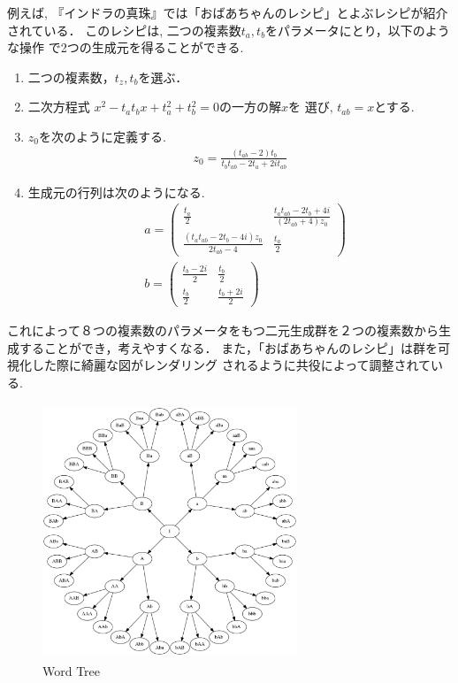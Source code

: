 例えば, 『インドラの真珠』では「おばあちゃんのレシピ」とよぶレシピが紹介
されている．
このレシピは, 二つの複素数$t_a, t_b$をパラメータにとり，以下のような操作
で2つの生成元を得ることができる.
\begin{enumerate}
 \item 二つの複素数，$t_z, t_b$を選ぶ．
 \item  二次方程式
        $x^2 - t_a t_b x + t_a^2 + t_b^2 = 0 \text{の一方の解}x\text{を
        選び, }t_{ab}= x \text{とする. }$
 \item $z_0$を次のように定義する.
       \begin{align*}
        z_0 = \frac{(t_{ab} -2)t_b}{t_b t_{ab} - 2 t_a + 2it_{ab}}
       \end{align*}
 \item 生成元の行列は次のようになる.
        \begin{align*}
       &a = \left(
      \begin{array}{ccc}
       \frac{t_a}{2} & \frac{t_a t_{ab} - 2 t_b + 4i}{(2 t_{ab} + 4)z_0} \\
       \frac{(t_a t_{ab} - 2 t_b -4i)z_0}{2 t_{ab} - 4} & \frac{t_a}{2}
      \end{array}
     \right)\\
 &b = \left(
      \begin{array}{ccc}
       \frac{t_b - 2i}{2} & \frac{t_b}{2} \\
       \frac{t_b}{2} & \frac{t_b + 2i}{2}
      \end{array}
     \right)
        \end{align*}
\end{enumerate}
これによって８つの複素数のパラメータをもつ二元生成群を２つの複素数から生
成することができ，考えやすくなる．
また，「おばあちゃんのレシピ」は群を可視化した際に綺麗な図がレンダリング
されるように共役によって調整されている.

\begin{figure}[htbp]
 \center
 \includegraphics[width=3in, height=3in, keepaspectratio]{../img/klein/wordTree.pdf}
 \caption{Word Tree}
 \label{fig:wordTree}
\end{figure}

